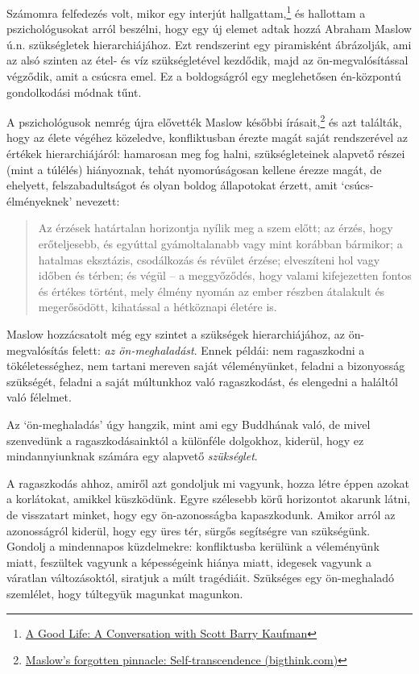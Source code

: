 Számomra felfedezés volt, mikor egy interjút hallgattam,\footnote{\href{https://www.samharris.org/podcasts/making-sense-episodes/209-a-good-life}{A
  Good Life: A Conversation with Scott Barry Kaufman}} és hallottam a
pszichológusokat arról beszélni, hogy egy új elemet adtak hozzá Abraham
Maslow ú.n. szükségletek hierarchiájához. Ezt rendszerint egy
piramisként ábrázolják, ami az alsó szinten az étel- és víz
szükségletével kezdődik, majd az ön-megvalósítással végződik, amit a
csúcsra emel. Ez a boldogságról egy meglehetősen én-központú
gondolkodási módnak tűnt.

\enlargethispage*{\baselineskip}

A pszichológusok nemrég újra elővették Maslow későbbi
írásait,\footnote{\href{https://bigthink.com/neuropsych/maslow-self-transcendence/}{Maslow's
  forgotten pinnacle: Self-transcendence (bigthink.com)}} és azt
találták, hogy az élete végéhez közeledve, konfliktusban érezte magát
saját rendszerével az értékek hierarchiájáról: hamarosan meg fog halni,
szükségleteinek alapvető részei (mint a túlélés) hiányoznak, tehát
nyomorúságosan kellene érezze magát, de ehelyett, felszabadultságot és
olyan boldog állapotokat érzett, amit `csúcs-élményeknek' nevezett:

\begin{quote}
Az érzések határtalan horizontja nyílik meg a szem előtt; az érzés, hogy
erőteljesebb, és egyúttal gyámoltalanabb vagy mint korábban bármikor; a
hatalmas eksztázis, csodálkozás és révület érzése; elveszíteni hol vagy
időben és térben; és végül -- a meggyőződés, hogy valami kifejezetten
fontos és értékes történt, mely élmény nyomán az ember részben átalakult
és megerősödött, kihatással a hétköznapi életére is.
\end{quote}

Maslow hozzácsatolt még egy szintet a szükségek hierarchiájához, az
ön-megvalósítás felett: \emph{az ön-meghaladást}. Ennek példái: nem
ragaszkodni a tökéletességhez, nem tartani mereven saját véleményünket,
feladni a bizonyosság szükségét, feladni a saját múltunkhoz való
ragaszkodást, és elengedni a haláltól való félelmet.

Az `ön-meghaladás' úgy hangzik, mint ami egy Buddhának való, de mivel
szenvedünk a ragaszkodásainktól a különféle dolgokhoz, kiderül, hogy ez
mindannyiunknak számára egy alapvető \emph{szükséglet}.

\enlargethispage*{\baselineskip}

A ragaszkodás ahhoz, amiről azt gondoljuk mi vagyunk, hozza létre éppen
azokat a korlátokat, amikkel küszködünk. Egyre szélesebb körű horizontot
akarunk látni, de visszatart minket, hogy egy ön-azonosságba
kapaszkodunk. Amikor arról az azonosságról kiderül, hogy egy üres tér,
sürgős segítségre van szükségünk. Gondolj a mindennapos küzdelmekre:
konfliktusba kerülünk a véleményünk miatt, feszültek vagyunk a
képességeink hiánya miatt, idegesek vagyunk a váratlan változásoktól,
siratjuk a múlt tragédiáit. Szükséges egy ön-meghaladó szemlélet, hogy
túltegyük magunkat magunkon.

